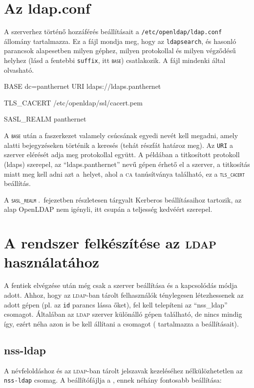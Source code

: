 \section{Az ldap.conf}
A szerverhez történő hozzáférés beállításait a \texttt{/etc/openldap/ldap.conf} állomány tartalmazza.
Ez a fájl mondja meg, hogy az \texttt{ldapsearch}, és hasonló parancsok alapesetben milyen géphez, milyen protokollal
és milyen végződésű helyhez (lásd a fentebbi \texttt{suffix}, itt \texttt{\textsc{base}}) csatlakozik. A fájl mindenki által
olvasható.

\begin{VerbExample}[frame=topline,label=ldap.conf]
BASE    dc=panthernet
URI     ldaps://ldaps.panthernet

TLS_CACERT /etc/openldap/ssl/cacert.pem

SASL_REALM panthernet
\end{VerbExample}

A \texttt{\textsc{base}} után a faszerkezet valamely csúcsának egyedi nevét kell megadni, amely alatti bejegyzéseken történik a
keresés (tehát részfát határoz meg). Az \texttt{URI} a szerver elérését adja meg protokollal együtt. A példában
a titkosított protokoll (ldaps) szerepel, az ``ldaps.panthernet'' nevű gépen érhető el a szerver, a titkosítás miatt meg
kell adni azt a~helyet, ahol a \textsc{ca} tanúsítványa található, ez a \texttt{\textsc{tls}\_\textsc{cacert}} beállítás.

A \texttt{\textsc{sasl}\_\textsc{realm}} .\ fejezetben részletesen tárgyalt Kerberos beállításaihoz
tartozik, az alap OpenLDAP nem igényli, itt csupán a teljesség kedvéért szerepel.

\section{A rendszer felkészítése az \textsc{ldap} használatához}

A fentiek elvégzése után még csak a szerver beállítása és a kapcsolódás módja adott. Ahhoz, hogy az \textsc{ldap}-ban tárolt
felhasználók ténylegesen létezhessenek az adott gépen (pl. az \texttt{id} parancs lássa őket), fel kell telepíteni 
az ``nss\_ldap'' csomagot. Általában az \textsc{ldap}
szerver különálló gépen található, de nincs mindig így, ezért néha azon is be kell állítani a csomagot
( tartalmazza a beállításait).

\subsection{nss-ldap}
A névfeloldáshoz és az \textsc{ldap}-ban tárolt jelszavak kezeléséhez nélkülözhetetlen az \texttt{nss-ldap} csomag. A
beállítófájlja a , ennek néhány fontosabb beállítása:

